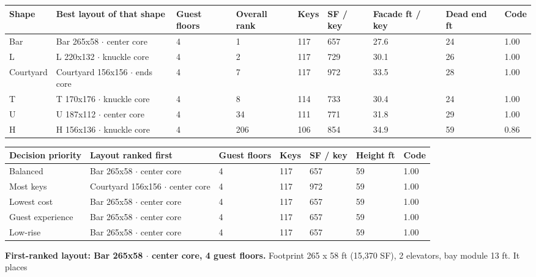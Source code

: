 \documentclass[10pt]{article}
\begin{document}
\begingroup{}\endgroup
{\small\begin{longtable}{p{1.7cm}p{4.6cm}p{1.1cm}p{1.2cm}p{0.9cm}p{1.1cm}p{1.4cm}p{1.2cm}p{0.9cm}}
\toprule
\textbf{Shape} & \textbf{Best layout of that shape} & \textbf{Guest floors} & \textbf{Overall rank} & \textbf{Keys} & \textbf{SF / key} & \textbf{Facade ft / key} & \textbf{Dead end ft} & \textbf{Code} \\ \midrule \endhead
Bar & Bar 265x58 $\cdot$ center core & 4 & 1 & 117 & 657 & 27.6 & 24 & 1.00 \\
L & L 220x132 $\cdot$ knuckle core & 4 & 2 & 117 & 729 & 30.1 & 26 & 1.00 \\
Courtyard & Courtyard 156x156 $\cdot$ ends core & 4 & 7 & 117 & 972 & 33.5 & 28 & 1.00 \\
T & T 170x176 $\cdot$ knuckle core & 4 & 8 & 114 & 733 & 30.4 & 24 & 1.00 \\
U & U 187x112 $\cdot$ center core & 4 & 34 & 111 & 771 & 31.8 & 29 & 1.00 \\
H & H 156x136 $\cdot$ knuckle core & 4 & 206 & 106 & 854 & 34.9 & 59 & 0.86 \\
\bottomrule
\end{longtable}}
\begingroup{}\endgroup
{\small\begin{longtable}{p{2.8cm}p{5.2cm}p{1.3cm}p{1.0cm}p{1.2cm}p{1.3cm}p{1.0cm}}
\toprule
\textbf{Decision priority} & \textbf{Layout ranked first} & \textbf{Guest floors} & \textbf{Keys} & \textbf{SF / key} & \textbf{Height ft} & \textbf{Code} \\ \midrule \endhead
Balanced & Bar 265x58 $\cdot$ center core & 4 & 117 & 657 & 59 & 1.00 \\
Most keys & Courtyard 156x156 $\cdot$ center core & 4 & 117 & 972 & 59 & 1.00 \\
Lowest cost & Bar 265x58 $\cdot$ center core & 4 & 117 & 657 & 59 & 1.00 \\
Guest experience & Bar 265x58 $\cdot$ center core & 4 & 117 & 657 & 59 & 1.00 \\
Low-rise & Bar 265x58 $\cdot$ center core & 4 & 117 & 657 & 59 & 1.00 \\
\bottomrule
\end{longtable}}
\textbf{First-ranked layout: Bar 265x58 $\cdot$ center core, 4 guest floors.} Footprint 265 x 58 ft
(15,370 SF), 2 elevators, bay module 13 ft. It places
\end{document}
